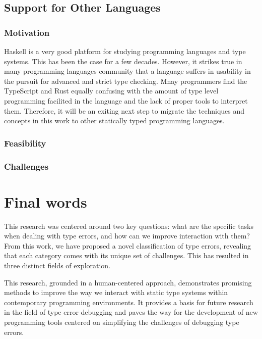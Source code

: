 \subsection{Support for Other Languages}
\subsubsection{Motivation}
Haskell is a very good platform for studying programming languages and type systems. This has been the case for a few decades. However, it strikes true in many programming languages community that a language suffers in usability in the pursuit for advanced and strict type checking. Mnay programmers find the TypeScript and Rust equally confusing with the amount of type level programming facilited in the language and the lack of proper tools to interpret them. Therefore, it will be an exiting next step to migrate the techniques and concepts in this work to other statically typed programming languages. 

\subsubsection{Feasibility}



\subsubsection{Challenges}


\section{Final words}

This research was centered around two key questions: what are the specific tasks when dealing with type errors, and how can we improve interaction with them? From this work, we have proposed a novel classification of type errors, revealing that each category comes with its unique set of challenges. This has resulted in three distinct fields of exploration. 

This research, grounded in a human-centered approach, demonstrates promising methods to improve the way we interact with static type systems within contemporary programming environments. It provides a basis for future research in the field of type error debugging and paves the way for the development of new programming tools centered on simplifying the challenges of debugging type errors. 
